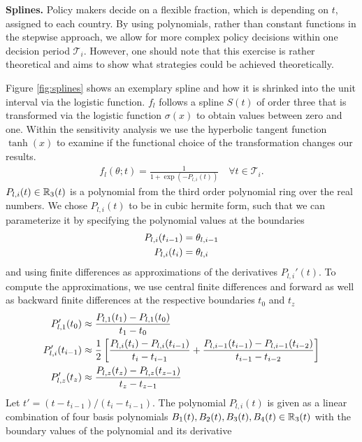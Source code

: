 \textbf{Splines.} Policy makers decide on a flexible fraction, which is depending on $t$, assigned to each country.  By using polynomials, rather than constant functions in the stepwise approach, we allow for more complex policy decisions within one decision period $\mathcal{T}_i$. However, one should note that this exercise is rather theoretical and aims to show what strategies could be achieved theoretically. 

Figure \ref{fig:splines} shows an exemplary spline and how it is shrinked into the unit interval via the logistic function. $f_{l}$ follows a spline $S(t)$ of order three that is transformed via the logistic function $\sigma(x)$ to obtain values between zero and one. Within the sensitivity analysis we use the hyperbolic tangent function $\tanh(x)$ to examine if the functional choice of the transformation changes our results.
\begin{align}
f_{l}(\theta; t) =  \frac{1}{1 + \exp{(-P_{l,i}(t))}} \quad \forall t \in \mathcal{T}_i. 
\end{align}
$P_{l,i}(t) \in \mathbb{R}_3(t)$ is a polynomial from the third order polynomial ring over the real numbers. We chose $P_{l,i}(t)$ to be in cubic hermite form, such that we can parameterize it by specifying the polynomial values at the boundaries 
\begin{align}
\label{eq:splines_bound_theta}
P_{l,i}(t_{i-1}) &= \theta_{l, i-1} \\
P_{l,i}(t_{i}) &= \theta_{l,i} \notag
\end{align}
and using finite differences as approximations of the derivatives $P_{l,i}'(t)$. To compute the approximations, we use central finite differences and forward as well as backward finite differences at the respective boundaries $t_0$ and $t_{z}$
\begin{align}
\label{eq:finite_differences}
P'_{l,1}(t_0) &\approx \frac{P_{l,1}(t_1) - P_{l,1}(t_0)}{t_1 - t_0} \\
P'_{l,i}(t_{i-1}) &\approx \frac{1}{2}\left[\frac{P_{l,i}(t_{i}) - P_{l,i}(t_{i-1})}{t_{i} - t_{i-1}} + \frac{P_{l,i-1}(t_{i-1}) - P_{l,i-1}( t_{i-2})}{t_{i-1} - t_{i-2}} \right] \notag \\
P'_{l,z}(t_{z}) &\approx \frac{P_{l,z}(t_{z}) - P_{l,z}(t_{z-1})}{t_{z} - t_{z-1}} \notag 
\end{align}
Let $t' = (t-t_{i-1})/(t_{i} - t_{i-1})$. The polynomial $P_{l,i}(t) $ is given as a linear combination of four basis polynomials  $B_1(t), B_2(t), B_3(t), B_4(t) \in \mathbb{R}_3(t)$ with the boundary values of the polynomial and its derivative
